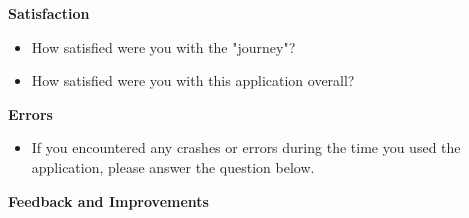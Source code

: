 \noindent \textbf{Satisfaction}

\begin{itemize}
    \item How satisfied were you with the "journey"?
    \item How satisfied were you with this application overall?
\end{itemize}

\noindent \textbf{Errors}

\begin{itemize}
    \item If you encountered any crashes or errors during the time you used the application, please answer the question below.

\end{itemize}

\noindent \textbf{Feedback and Improvements}

